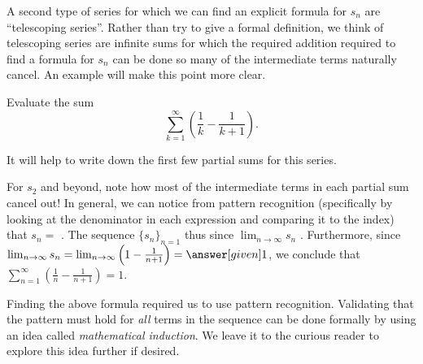 \documentclass{ximera}
\begin{document}
A second type of series for which we can find an explicit formula for $s_n$ are ``telescoping series''.  Rather than try to give a formal definition, we think of telescoping series are infinite sums for which the required addition required to find a formula for $s_n$ can be done so many of the intermediate terms naturally cancel.  An example will make this point more clear.

\begin{example}
  Evaluate the sum
  \[
  \sum_{k=1}^\infty\left(\frac{1}{k}-\frac{1}{k+1}\right).
  \]
  \begin{explanation}
It will help to write down the first few partial sums for this series.
\begin{image}
\end{image}
For $s_2$ and beyond, note how most of the intermediate terms in each partial sum cancel out! In
general, we can notice from pattern recognition (specifically by looking at the denominator in each expression and comparing it to the index) that $s_n =$ . The sequence $\{s_n\}_{n=1}$ thus  since $\lim_{n \to \infty} s_n$ . Furthermore, since $\lim_{n\to\infty}s_n = \lim_{n\to\infty}\left(1-\frac1{n+1}\right) = \answer[given]1$, we conclude
that $\sum_{n=1}^\infty \left(\frac1n-\frac1{n+1}\right) = 1$.
  \end{explanation}
\end{example}

\begin{remark}
Finding the above formula required us to use pattern recognition.  Validating that the pattern must hold for \emph{all} terms in the sequence can be done formally by using an idea called \emph{mathematical induction}.  We leave it to the curious reader to explore this idea further if desired.
\end{remark}
\end{document}
